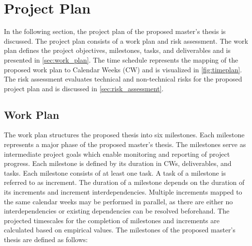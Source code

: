 \chapter{Project Plan}
\label{ch:project_plan}
In the following section, the project plan of the proposed master's thesis is discussed.
The project plan consists of a work plan and risk assessment.
The work plan defines the project objectives, milestones, tasks, and deliverables and is presented in \autoref{sec:work_plan}.
The time schedule represents the mapping of the proposed work plan to Calendar Weeks (CW) and is visualized in \autoref{fig:timeplan}.
The risk assessment evaluates technical and non-technical risks for the proposed project plan and is discussed in \autoref{sec:risk_assessment}.

\section{Work Plan}
\label{sec:work_plan}
The work plan structures the proposed thesis into six milestones.
Each milestone represents a major phase of the proposed master's thesis.
The milestones serve as intermediate project goals which enable monitoring and reporting of project progress.
Each milestone is defined by its duration in CWs, deliverables, and tasks.
Each milestone consists of at least one task.
A task of a milestone is referred to as increment.
The duration of a milestone depends on the duration of its increments and increment interdependencies.
Multiple increments mapped to the same calendar weeks may be performed in parallel, as there are either no interdependencies or existing dependencies can be resolved beforehand.
The projected timescales for the completion of milestones and increments are calculated based on empirical values.
The milestones of the proposed master's thesis are defined as follows:
